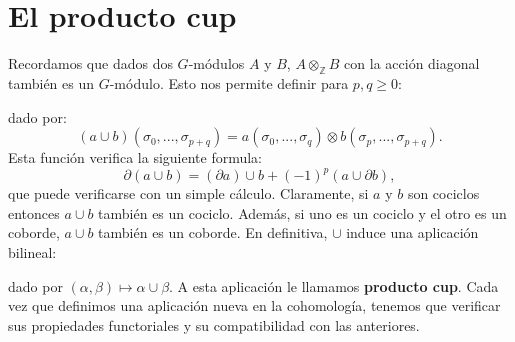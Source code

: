 \documentclass[a4paper,12pt, leqno]{article}
\begin{document}
\section{El producto cup}
Recordamos que dados dos $G$-módulos $A$ y $B$, $A \otimes_{\mathbb{Z}} B$ con la acción diagonal también es un $G$-módulo. Esto nos permite definir para $p,q \geq 0 $:
\begin{center}
\end{center}
dado por:
\begin{equation*}
(a\cup b)(\sigma_0,...,\sigma_{p+q})=a(\sigma_0,...,\sigma_q)\otimes b(\sigma_p,...,\sigma_{p+q}).
\end{equation*}
Esta función verifica la siguiente formula:
\begin{equation*}
\partial(a \cup b)=(\partial a) \cup b + (-1)^p (a\cup \partial b),
\end{equation*}
que puede verificarse con un simple cálculo. Claramente, si $a$ y $b$ son cociclos entonces $a \cup b$ también es un cociclo. Además, si uno es  un cociclo y el otro es un coborde, $a \cup b$ también es un coborde. En definitiva, $\cup$ induce una aplicación bilineal:
\begin{center}
\end{center}
dado por $(\alpha, \beta) \mapsto \alpha \cup \beta$. A esta aplicación le llamamos \textbf{producto cup}. Cada vez que definimos una aplicación nueva en la cohomología, tenemos que verificar sus propiedades functoriales y su compatibilidad con las anteriores. 
	

	
\end{document}
